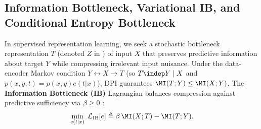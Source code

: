 \documentclass[../../../../master.tex]{subfiles}
\begin{document}
\subsection{Information Bottleneck, Variational IB, and Conditional Entropy Bottleneck}

In supervised representation learning, we seek a stochastic bottleneck representation $T$ (denoted $Z$ in ) of input $X$ that preserves predictive information about target $Y$ while compressing irrelevant input nuisance. Under the data-encoder Markov condition $Y \leftrightarrow X \to T$ (so $T \indep Y \mid X$ and $p(x, y, t) = p(x, y)e(t|x)$), DPI guarantees $\MI(T; Y) \le \MI(X; Y)$. The \textbf{Information Bottleneck (IB)} Lagrangian balances compression against predictive sufficiency via $\beta \ge 0$ :
\begin{equation}
\label{eq:infotheory:ib_obj}
  \min_{e(t|x)} \; \mathcal{L}_{\mathrm{IB}}[e] \triangleq \beta\,\MI(X; T) - \MI(T; Y).
\end{equation}
\end{document}
